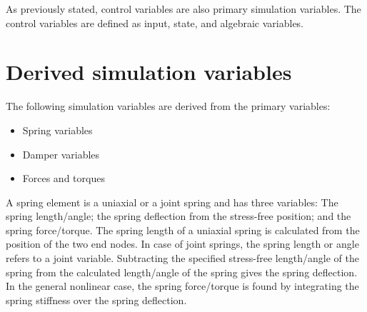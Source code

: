 {As previously stated, control variables are also primary simulation variables.
The control variables are defined as input, state, and algebraic variables.

\section{Derived simulation variables}

The following simulation variables are derived from the primary variables:
%
\begin{itemize}
\item   Spring variables
\item   Damper variables
\item   Forces and torques
\end{itemize}

A spring element is a uniaxial or a joint spring and has three variables:
The spring length/angle; the spring deflection from the stress-free position;
and the spring force/torque.
The spring length of a uniaxial spring is calculated from the position of the
two end nodes.
In case of joint springs, the spring length or angle refers to a joint variable.
Subtracting the specified stress-free length/angle of the spring from the
calculated length/angle of the spring gives the spring deflection.
In the general nonlinear case, the spring force/torque is found by integrating
the spring stiffness over the spring deflection.

}
